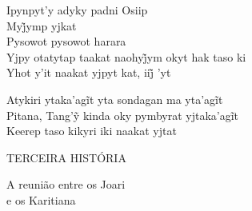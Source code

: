 \bigskip

\begin{linenumbers}\begingroup\raggedright
 
\noindent   Ipynpyt'y adyky padni Osiip\\
  Myj̃ymp yjkat\\
  Pysowot pysowot harara\\
  Yjpy otatytap taakat naohyj̃ym okyt hak taso ki\\
  Yhot y’it naakat yjpyt kat, iij̃ ’yt
 
\end{linenumbers}\endgroup

\bigskip

\begin{linenumbers}\begingroup\raggedright
 
\noindent   Atykiri ytaka’agĩt yta sondagan ma yta’agĩt\\
  Pitana, Tang’ỹ kinda oky pymbyrat yjtaka’agĩt\\
  Keerep taso kikyri iki naakat yjtat
\end{linenumbers}\endgroup


\blankpage
\pagebreak
\thispagestyle{empty}
\mbox{}
\begin{center}
\vspace{4cm}
{\formularlight\small TERCEIRA HISTÓRIA}

\medskip

{\formular\huge A reunião entre os Joari\\\vspace{0.2cm} e os Karitiana}
\end{center}
\pagebreak



